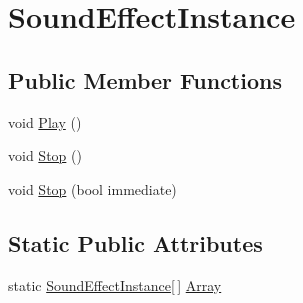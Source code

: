 \hypertarget{classMicrosoft_1_1Xna_1_1Framework_1_1Audio_1_1SoundEffectInstance}{}\section{Sound\+Effect\+Instance}
\label{classMicrosoft_1_1Xna_1_1Framework_1_1Audio_1_1SoundEffectInstance}
\subsection*{Public Member Functions}
\begin{DoxyCompactItemize}
\item 
void \hyperlink{classMicrosoft_1_1Xna_1_1Framework_1_1Audio_1_1SoundEffectInstance_a12574569144fb9d22d996965ee42b627}{Play} ()
\item 
void \hyperlink{classMicrosoft_1_1Xna_1_1Framework_1_1Audio_1_1SoundEffectInstance_a17a237457e57625296e6b24feb19c60a}{Stop} ()
\item 
void \hyperlink{classMicrosoft_1_1Xna_1_1Framework_1_1Audio_1_1SoundEffectInstance_a45f9888d4326aa8d8358133c6c92f47b}{Stop} (bool immediate)
\end{DoxyCompactItemize}
\subsection*{Static Public Attributes}
\begin{DoxyCompactItemize}
\item 
static \hyperlink{classMicrosoft_1_1Xna_1_1Framework_1_1Audio_1_1SoundEffectInstance}{Sound\+Effect\+Instance}\mbox{[}$\,$\mbox{]} \hyperlink{classMicrosoft_1_1Xna_1_1Framework_1_1Audio_1_1SoundEffectInstance_af3a5f44d12db3036fccfec2c841617de}{Array}
\end{DoxyCompactItemize}
